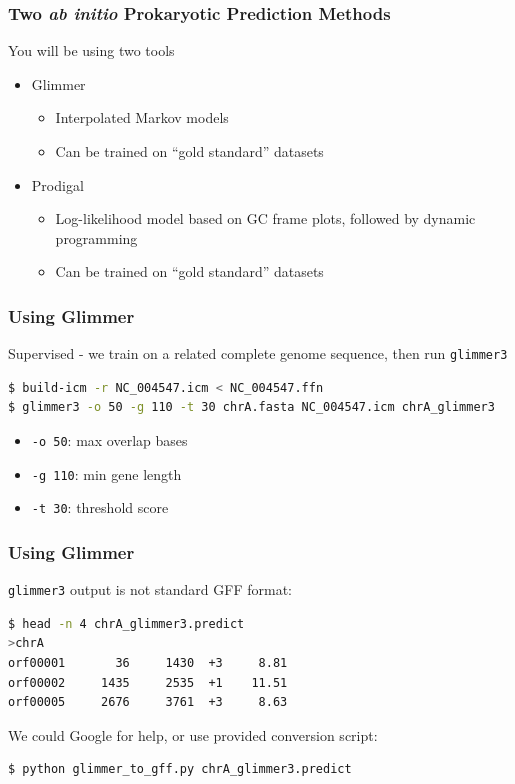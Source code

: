 \documentclass[table]{beamer}
\begin{document}
    \begin{frame}
     \frametitle{Two \textit{ab initio} Prokaryotic Prediction Methods}
     You will be using two tools
     \begin{itemize}
       \item Glimmer
       \begin{itemize}
         \item Interpolated Markov models
         \item Can be trained on ``gold standard'' datasets
       \end{itemize}
       \item Prodigal
       \begin{itemize}
         \item Log-likelihood model based on GC frame plots, followed by dynamic programming
         \item Can be trained on ``gold standard'' datasets
       \end{itemize}
     \end{itemize}
    \end{frame}

\begin{frame}[fragile]
\frametitle{Using Glimmer}
Supervised - we train on a related complete genome sequence, then run \texttt{glimmer3}
\begin{lstlisting}[language=bash]
$ build-icm -r NC_004547.icm < NC_004547.ffn
$ glimmer3 -o 50 -g 110 -t 30 chrA.fasta NC_004547.icm chrA_glimmer3
\end{lstlisting}
    \begin{itemize}
      \item \texttt{-o 50}: max overlap bases
      \item \texttt{-g 110}: min gene length
      \item \texttt{-t 30}:  threshold score
    \end{itemize}
\end{frame}

\begin{frame}[fragile]
\frametitle{Using Glimmer}
\texttt{glimmer3} output is not standard GFF format:
\begin{lstlisting}[language=bash]
$ head -n 4 chrA_glimmer3.predict 
>chrA
orf00001       36     1430  +3     8.81
orf00002     1435     2535  +1    11.51
orf00005     2676     3761  +3     8.63
\end{lstlisting}
We could Google for help, or use provided conversion script:
\begin{lstlisting}[language=bash]
$ python glimmer_to_gff.py chrA_glimmer3.predict
\end{lstlisting}    
\end{frame}
\end{document}
